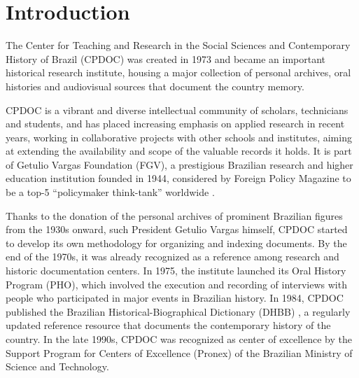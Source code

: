 \section{Introduction}\label{sec:intro}

%

The Center for Teaching and Research in the Social Sciences and
Contemporary History of Brazil (CPDOC) was created in 1973 and became
an important historical research institute, housing a major collection
of personal archives, oral histories and audiovisual sources that
document the country memory.

CPDOC is a vibrant and diverse intellectual community of scholars,
technicians and students, and has placed increasing emphasis on
applied research in recent years, working in collaborative projects
with other schools and institutes, aiming at extending the
availability and scope of the valuable records it holds. It is part of
Getulio Vargas Foundation (FGV), a prestigious Brazilian research and
higher education institution founded in 1944, considered by Foreign
Policy Magazine to be a top-5 ``policymaker think-tank'' worldwide
\cite{think-tank}.

Thanks to the donation of the personal archives of prominent Brazilian
figures from the 1930s onward, such President Getulio Vargas himself,
CPDOC started to develop its own methodology for organizing and
indexing documents. By the end of the 1970s, it was already recognized
as a reference among research and historic documentation centers. In
1975, the institute launched its Oral History Program (PHO), which
involved the execution and recording of interviews with people who
participated in major events in Brazilian history. In 1984, CPDOC
published the Brazilian Historical-Biographical Dictionary (DHBB)
\cite{dhbb}, a regularly updated reference resource that documents the
contemporary history of the country. In the late 1990s, CPDOC was
recognized as center of excellence by the Support Program for Centers
of Excellence (Pronex) of the Brazilian Ministry of Science and
Technology.

